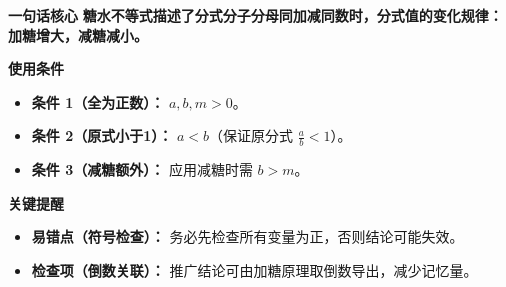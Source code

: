 \begin{summarybox}
\textbf{\textcolor{CSummary}{一句话核心}}
\textbf{糖水不等式描述了分式分子分母同加减同数时，分式值的变化规律：加糖增大，减糖减小。}

\medskip
\textbf{\textcolor{CSummary}{使用条件}}
\begin{itemize}[leftmargin=*, itemsep=0.5em, topsep=0.4em]
    \item \textbf{条件 1（全为正数）：} $a, b, m > 0$。
    \item \textbf{条件 2（原式小于1）：} $a < b$（保证原分式 $\frac{a}{b} < 1$）。
    \item \textbf{条件 3（减糖额外）：} 应用减糖时需 $b > m$。
\end{itemize}

\medskip
\textbf{\textcolor{CSummary}{关键提醒}}
\begin{itemize}[leftmargin=*, itemsep=0.5em, topsep=0.4em]
    \item \textbf{易错点（符号检查）：} 务必先检查所有变量为正，否则结论可能失效。
    \item \textbf{检查项（倒数关联）：} 推广结论可由加糖原理取倒数导出，减少记忆量。
\end{itemize}
\end{summarybox}
